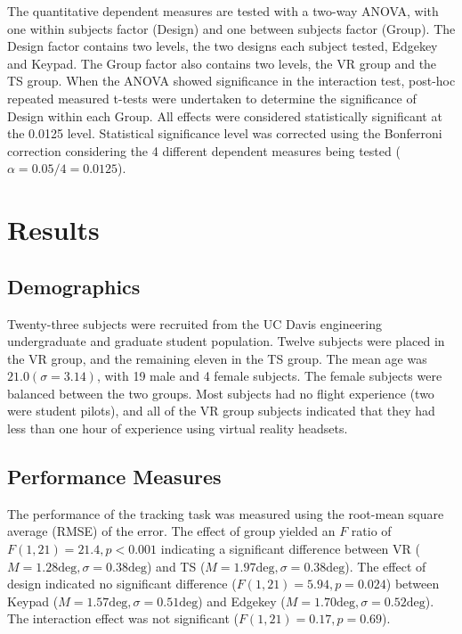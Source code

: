 The quantitative dependent measures are tested with a two-way ANOVA, with one within subjects factor (Design) and one between subjects factor (Group).
The Design factor contains two levels, the two designs each subject tested, Edgekey and Keypad.
The Group factor also contains two levels, the VR group and the TS group.
When the ANOVA showed significance in the interaction test, post-hoc repeated measured t-tests were undertaken to determine the significance of Design within each Group.
All effects were considered statistically significant at the 0.0125 level.
Statistical significance level was corrected using the Bonferroni correction considering the 4 different dependent measures being tested ($\alpha = 0.05/4 = 0.0125$).

\section{Results}

\subsection{Demographics}

Twenty-three subjects were recruited from the UC Davis engineering undergraduate and graduate student population.
Twelve subjects were placed in the VR group, and the remaining eleven in the TS group.
The mean age was $21.0 (\sigma = 3.14)$, with 19 male and 4 female subjects.
The female subjects were balanced between the two groups.
Most subjects had no flight experience (two were student pilots), and all of the VR group subjects indicated that they had less than one hour of experience using virtual reality headsets.

\subsection{Performance Measures}

The performance of the tracking task was measured using the root-mean square average (RMSE) of the error.
The effect of group yielded an $F$ ratio of $F(1, 21) = 21.4, p < 0.001$ indicating a significant difference between VR ($M=1.28\mathrm{deg}, \sigma=0.38\mathrm{deg}$) and TS ($M=1.97\mathrm{deg}, \sigma=0.38\mathrm{deg}$).
The effect of design indicated no significant difference ($F(1, 21) = 5.94, p=0.024$) between Keypad ($M=1.57\mathrm{deg}, \sigma=0.51\mathrm{deg}$) and Edgekey ($M=1.70\mathrm{deg}, \sigma=0.52\mathrm{deg}$).
The interaction effect was not significant ($F(1, 21) = 0.17, p=0.69$).

